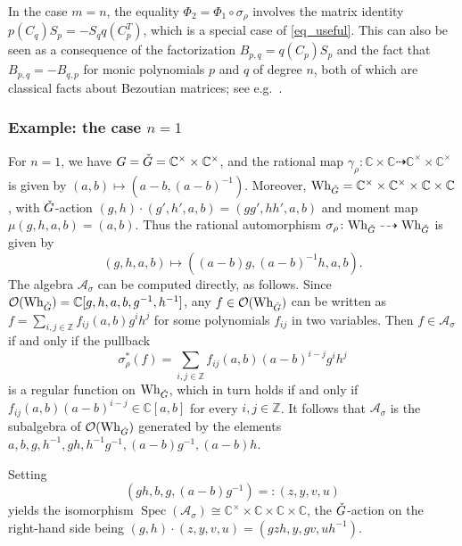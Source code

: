 \documentclass[11pt]{article}
\theoremstyle{definition}
\theoremstyle{plain}
\theoremstyle{remark}
\newcommand{\numberset}{\mathbb}
\newcommand{\C}{\numberset{C}}
\newcommand{\Z}{\numberset{Z}}
\DeclareMathOperator{\spec}{Spec}
\begin{document}
        \begin{rmk}
            In the case $m=n$, the equality $\Phi_2 = \Phi_1 \circ \sigma_\rho$ involves the matrix identity $p(C_q)S_p=-S_qq(C_p^T)$, which is a special case of \eqref{eq_useful}. This can also be seen as a consequence of the factorization $B_{p,q} = q(C_p)S_p$ and the fact that $B_{p,q} = -B_{q,p}$ for monic polynomials $p$ and $q$ of degree $n$, both of which are classical facts about Bezoutian matrices; see e.g.\ \cite{HELMKE19891039}.
        \end{rmk}

        \subsubsection{Example: the case \texorpdfstring{$n=1$}{n=1}}

        For $n=1$, we have $G = \Check{G} = \C^\times \times \C^\times$, and the rational map $\gamma_\rho\colon \C \times \C \dashrightarrow \C^\times \times \C^\times$ is given by $(a,b) \mapsto (a-b,(a-b)^{-1})$. Moreover, $\mathrm{Wh}_{\Check{G}} = \C^\times \times \C^\times \times \C \times \C$, with $\Check{G}$-action $(g,h) \cdot (g',h',a,b) = (gg', hh', a, b)$ and moment map $\mu(g,h,a,b) = (a,b)$. Thus the rational automorphism $\sigma_{\rho}\colon \mathrm{Wh}_{\Check{G}} \dashrightarrow \mathrm{Wh}_{\Check{G}}$ is given by
        \[
            (g,h,a,b) \mapsto ((a-b)g,(a-b)^{-1}h,a,b).
        \] 
        The algebra $\mathcal{A}_{\sigma}$ can be computed directly, as follows. Since $\mathcal{O}(\mathrm{Wh}_{\Check{G}}) = \C[g,h,a,b,g^{-1},h^{-1}]$, any $f \in \mathcal{O}(\mathrm{Wh}_{\Check{G}})$ can be written as $f = \sum_{i,j \in \Z} f_{ij}(a,b)g^{i}h^{j}$ for some polynomials $f_{ij}$ in two variables. Then $f \in \mathcal{A}_{\sigma}$ if and only if the pullback
        \[
            \sigma_\rho^*(f) = \sum_{i,j \in \Z} f_{ij}(a,b)(a-b)^{i-j}g^ih^j
        \]
        is a regular function on $\mathrm{Wh}_{\Check{G}}$, which in turn holds if and only if $f_{ij}(a,b)(a-b)^{i-j} \in \C[a,b]$ for every $i,j \in \Z$. It follows that $\mathcal{A}_{\sigma}$ is the subalgebra of $\mathcal{O}(\mathrm{Wh}_{\Check{G}})$ generated by the elements $a,b,g,h^{-1},gh,h^{-1}g^{-1}, (a-b)g^{-1},(a-b)h$.
    
        Setting
        \[
            (gh,b,g,(a-b)g^{-1}) =: (z,y,v,u)
        \]
        yields the isomorphism $\spec(\mathcal{A}_{\sigma}) \cong \C^\times \times \C \times \C \times \C$, the $\Check{G}$-action on the right-hand side being $(g,h) \cdot (z,y,v,u) = (gzh,y,gv,uh^{-1})$.
\end{document}
